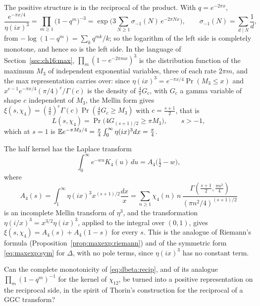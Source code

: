 The positive structure is in the reciprocal of the product. With $q=e^{-2\pi x}$,
\begin{equation}\label{eq:dbeta:recip}
\frac{e^{-\pi x/4}}{\eta(ix)^3}=\prod_{m\ge1}\big(1-q^m\big)^{-3}=\exp\Big(3\sum_{N\ge1}\sigma_{-1}(N)\,e^{-2\pi Nx}\Big),\qquad\sigma_{-1}(N)=\sum_{d\mid N}\frac1d,
\end{equation}
from $-\log(1-q^m)=\sum_kq^{mk}/k$; so the logarithm of the left side is completely monotone, and hence so is the left side. In the language of Section~\ref{sec:ch16:max}, $\prod_m(1-e^{-2\pi mx})^3$ is the distribution function of the maximum $M_3$ of independent exponential variables, three of each rate $2\pi m$, and the max representation carries over: since $\eta(ix)^3=e^{-\pi x/4}\Pr(M_3\le x)$ and $x^{c-1}e^{-\pi x/4}(\pi/4)^c/\Gamma(c)$ is the density of $\frac4\pi G_c$, with $G_c$ a gamma variable of shape $c$ independent of $M_3$, the Mellin form gives $\xi(s,\chi_4)=(\frac4\pi)^c\Gamma(c)\Pr(\frac4\pi G_c\ge M_3)$ with $c=\frac{s+1}2$, that is
\[
L(s,\chi_4)=\Pr\big(4G_{(s+1)/2}\ge\pi M_3\big),\qquad s>-1,
\]
which at $s=1$ is $\mathbb{E} e^{-\pi M_3/4}=\frac\pi4\int_0^\infty\eta(ix)^3dx=\frac\pi4$.

The half kernel has the Laplace transform
\begin{equation}\label{eq:dbeta:incomplete}
\int_0^\infty e^{-wu}K_4(u)\,du=A_4\big(\tfrac12-w\big),
\end{equation}
where
\[
A_4(s)=\int_1^\infty\eta(ix)^3x^{(s+1)/2}\frac{dx}x=\sum_{n\ge1}\chi_4(n)\,n\,\frac{\Gamma(\frac{s+1}2,\frac{\pi n^2}4)}{(\pi n^2/4)^{(s+1)/2}}
\]
is an incomplete Mellin transform of $\eta^3$, and the transformation $\eta(i/x)^3=x^{3/2}\eta(ix)^3$, applied to the integral over $(0,1)$, gives $\xi(s,\chi_4)=A_4(s)+A_4(1-s)$ for every $s$. This is the analogue of Riemann's formula (Proposition~\ref{prop:maxexp:riemann}) and of the symmetric form \eqref{eq:maxexp:sym} for $\Delta$, with no pole terms, since $\eta(ix)^3$ has no constant term.

\begin{question}\label{q:dbeta:recip}
Can the complete monotonicity of \eqref{eq:dbeta:recip}, and of its analogue $\prod_m(1-q^m)^{-1}$ for the kernel of $\chi_{12}$, be turned into a positive representation on the reciprocal side, in the spirit of Thorin's construction for the reciprocal of a GGC transform?
\end{question}
